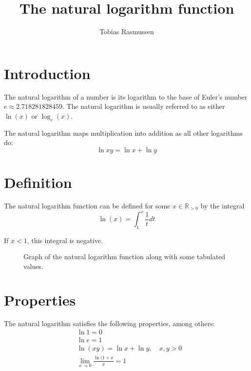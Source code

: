 \documentclass[twocolumn, a4paper]{article}
\title{The natural logarithm function}
\author{Tobias Rasmussen}
\begin{document}
\maketitle

\section{Introduction}
The natural logarithm of a number is its logarithm to the base of Euler's number $e \approx 2.718281828459$. The natural logarithm is usually referred to as either $\ln(x)$ or $\log_e(x)$.

The natural logarithm maps multiplication into addition as all other logarithms do:
\begin{equation}
	\ln xy = \ln x + \ln y
\end{equation}

\section{Definition}
The natural logarithm function can be defined for some $x\in \mathbb{R}_{>0}$ by the integral
\begin{equation}
	\ln(x) = \int_1^x \frac{1}{t} dt
\end{equation}

If $x<1$, this integral is negative.

\begin{figure}
	
	\caption{Graph of the natural logarithm function along with some tabulated values.}
	\label{fig:plot}
\end{figure}

\section{Properties}
The natural logarithm satisfies the following properties, among others:
\begin{align}
	&\ln 1 = 0 \\
	&\ln e = 1 \\
	&\ln(xy) = \ln x + \ln y, \quad x,y > 0 \\
	&\lim_{x\rightarrow 0} \frac{\ln(1+x}{x} = 1
\end{align}
\end{document}
